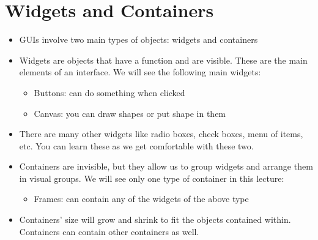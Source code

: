 \documentclass[letterpaper,10pt,english]{sphinxmanual}
\begin{document}
\section{Widgets and Containers}
\label{\detokenize{lecture_notes/lec22_tkinter:widgets-and-containers}}\begin{itemize}
\item {} 
GUIs involve two main types of objects: widgets and containers

\item {} 
Widgets are objects that have a function and are visible. These
are the main elements of an interface. We will see the following
main widgets:
\begin{itemize}
\item {} 
Buttons: can do something when clicked

\item {} 
Canvas: you can draw shapes or put shape in them

\end{itemize}

\item {} 
There are many other widgets like radio boxes, check boxes, menu of
items, etc. You can learn these as we get comfortable with these two.

\item {} 
Containers are invisible, but they allow us to group widgets and
arrange them in visual groups. We will see only one type of container
in this lecture:
\begin{itemize}
\item {} 
Frames: can contain any of the widgets of the above type

\end{itemize}

\item {} 
Containers’ size will grow and shrink to fit the objects contained
within. Containers can contain other containers as well.

\end{itemize}
\end{document}
